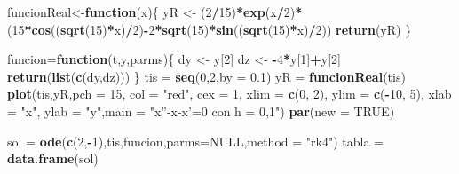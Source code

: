 \documentclass[]{article}
\newenvironment{Shaded}{\begin{snugshade}}{\end{snugshade}}
\newcommand{\KeywordTok}[1]{\textcolor[rgb]{0.13,0.29,0.53}{\textbf{#1}}}
\newcommand{\DataTypeTok}[1]{\textcolor[rgb]{0.13,0.29,0.53}{#1}}
\newcommand{\DecValTok}[1]{\textcolor[rgb]{0.00,0.00,0.81}{#1}}
\newcommand{\FloatTok}[1]{\textcolor[rgb]{0.00,0.00,0.81}{#1}}
\newcommand{\StringTok}[1]{\textcolor[rgb]{0.31,0.60,0.02}{#1}}
\newcommand{\OtherTok}[1]{\textcolor[rgb]{0.56,0.35,0.01}{#1}}
\newcommand{\ControlFlowTok}[1]{\textcolor[rgb]{0.13,0.29,0.53}{\textbf{#1}}}
\newcommand{\OperatorTok}[1]{\textcolor[rgb]{0.81,0.36,0.00}{\textbf{#1}}}
\newcommand{\NormalTok}[1]{#1}
\begin{document}
\begin{Shaded}
\begin{Highlighting}[]
\NormalTok{funcionReal<-}\ControlFlowTok{function}\NormalTok{(x)\{}
\NormalTok{  yR <-}\StringTok{ }\NormalTok{(}\DecValTok{2}\OperatorTok{/}\DecValTok{15}\NormalTok{)}\OperatorTok{*}\KeywordTok{exp}\NormalTok{(x}\OperatorTok{/}\DecValTok{2}\NormalTok{)}\OperatorTok{*}\NormalTok{(}\DecValTok{15}\OperatorTok{*}\KeywordTok{cos}\NormalTok{((}\KeywordTok{sqrt}\NormalTok{(}\DecValTok{15}\NormalTok{)}\OperatorTok{*}\NormalTok{x)}\OperatorTok{/}\DecValTok{2}\NormalTok{)}\OperatorTok{-}\DecValTok{2}\OperatorTok{*}\KeywordTok{sqrt}\NormalTok{(}\DecValTok{15}\NormalTok{)}\OperatorTok{*}\KeywordTok{sin}\NormalTok{((}\KeywordTok{sqrt}\NormalTok{(}\DecValTok{15}\NormalTok{)}\OperatorTok{*}\NormalTok{x)}\OperatorTok{/}\DecValTok{2}\NormalTok{))}
  \KeywordTok{return}\NormalTok{(yR)}
\NormalTok{\}}

\NormalTok{funcion=}\ControlFlowTok{function}\NormalTok{(t,y,parms)\{}
\NormalTok{  dy <-}\StringTok{ }\NormalTok{y[}\DecValTok{2}\NormalTok{]}
\NormalTok{  dz <-}\StringTok{ }\OperatorTok{-}\DecValTok{4}\OperatorTok{*}\NormalTok{y[}\DecValTok{1}\NormalTok{]}\OperatorTok{+}\NormalTok{y[}\DecValTok{2}\NormalTok{]}
  \KeywordTok{return}\NormalTok{(}\KeywordTok{list}\NormalTok{(}\KeywordTok{c}\NormalTok{(dy,dz)))}
\NormalTok{\}}
\NormalTok{tis =}\StringTok{ }\KeywordTok{seq}\NormalTok{(}\DecValTok{0}\NormalTok{,}\DecValTok{2}\NormalTok{,}\DataTypeTok{by =} \FloatTok{0.1}\NormalTok{)}
\NormalTok{yR =}\StringTok{ }\KeywordTok{funcionReal}\NormalTok{(tis)}
\KeywordTok{plot}\NormalTok{(tis,yR,}\DataTypeTok{pch =} \DecValTok{15}\NormalTok{, }\DataTypeTok{col =} \StringTok{"red"}\NormalTok{, }\DataTypeTok{cex =} \DecValTok{1}\NormalTok{, }\DataTypeTok{xlim =} \KeywordTok{c}\NormalTok{(}\DecValTok{0}\NormalTok{, }\DecValTok{2}\NormalTok{), }\DataTypeTok{ylim =} \KeywordTok{c}\NormalTok{(}\OperatorTok{-}\DecValTok{10}\NormalTok{, }\DecValTok{5}\NormalTok{), }\DataTypeTok{xlab =} \StringTok{"x"}\NormalTok{, }\DataTypeTok{ylab =} \StringTok{"y"}\NormalTok{,}\DataTypeTok{main =} \StringTok{"x''-x-x'=0 con h = 0,1"}\NormalTok{)}
\KeywordTok{par}\NormalTok{(}\DataTypeTok{new =} \OtherTok{TRUE}\NormalTok{)}

\NormalTok{sol =}\StringTok{ }\KeywordTok{ode}\NormalTok{(}\KeywordTok{c}\NormalTok{(}\DecValTok{2}\NormalTok{,}\OperatorTok{-}\DecValTok{1}\NormalTok{),tis,funcion,}\DataTypeTok{parms=}\OtherTok{NULL}\NormalTok{,}\DataTypeTok{method =} \StringTok{"rk4"}\NormalTok{)}
\NormalTok{tabla =}\StringTok{ }\KeywordTok{data.frame}\NormalTok{(sol)}


\end{Highlighting}
\end{Shaded}
\end{document}
